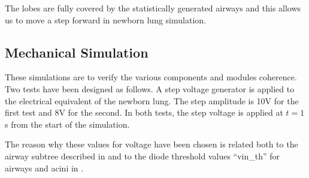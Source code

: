 The lobes are fully covered by the statistically generated airways and
this allows us to move a step forward in newborn lung simulation.

\subsection{Mechanical Simulation}
\label{subsec:mechanical_results_subsec}



These simulations are to verify the various components and modules
coherence.  Two tests have been designed as follows.  A step voltage
generator is applied to the electrical equivalent of the newborn lung.
The step amplitude is 10V for the first test and 8V for the second.
In both tests, the step voltage is applied at $t=1$s from the start of
the simulation.

The reason why these values for voltage have been chosen is related
both to the airway subtree described in 
and to the diode threshold values ``vin\_th'' for airways and acini in
.




